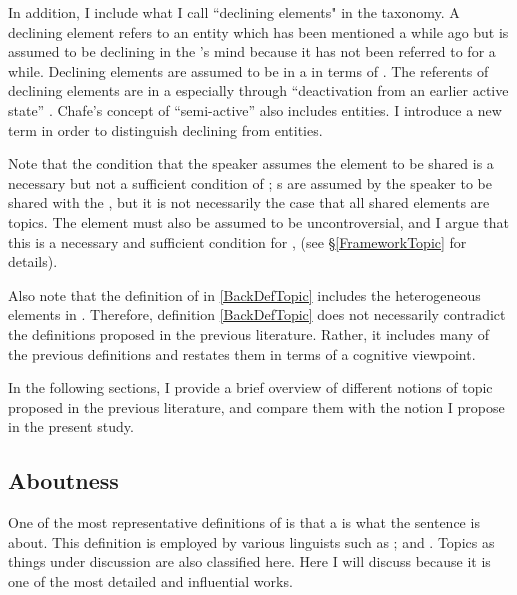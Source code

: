 In addition, I include what I call ``declining elements" \citep{Prince1981} in the taxonomy. A declining element refers to an entity which has been mentioned a while ago but is assumed to be declining in the 's mind because it has not been referred to for a while.
Declining elements are assumed to be in a  in terms of .
The referents of declining elements are in a  especially through ``deactivation from an earlier active state'' \cite[29]{chafe87}.
Chafe's concept of ``semi-active'' also includes  entities. I introduce a new term in order to distinguish declining from  entities. 

Note that the condition that the speaker assumes the element to be shared is a necessary but not a sufficient condition of ;
s are assumed by the speaker to be shared with the ,
but it is not necessarily the case that
all shared elements are topics.
The  element must also be assumed to be uncontroversial,
and I argue that this is a necessary and sufficient condition for ,
(see \S \ref{FrameworkTopic} for details).

Also note that the definition of  in \ref{BackDefTopic} includes the heterogeneous elements in \Last.
Therefore, definition \ref{BackDefTopic} does not necessarily contradict the definitions proposed in the previous literature.
Rather, it includes many of the previous definitions and restates them in terms of a cognitive viewpoint.

In the following sections, I provide a brief overview of different notions of topic proposed in the previous literature, and compare them with the notion I propose in the present study.

\subsection{Aboutness}

One of the most representative definitions of  is that
a  is what the sentence is about.
This definition is employed by various linguists such as ; and .
Topics as things under discussion \cite[e.g.,][]{heycock08} are also classified here.
Here I will discuss  because it is one of the most detailed and influential works.

